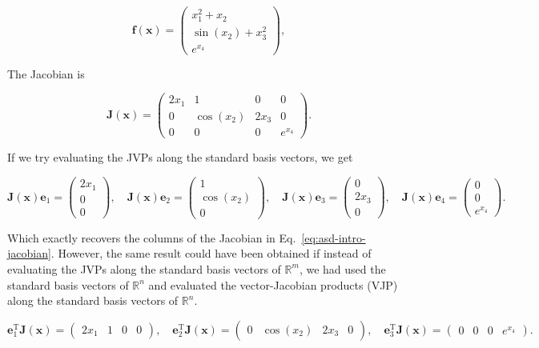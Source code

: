 \documentclass[12pt,a4paper]{article}
\numberwithin{equation}{section}
\begin{document}
\begin{equation}
  \bm f(\bm x)=\begin{pmatrix}
    x_1^2+x_2\\ \sin(x_2)+x_3^2\\  e^{x_4}
  \end{pmatrix},
  \label{eq:asd-intro-function}
\end{equation}

The Jacobian is

\begin{equation}
  \bm J(\bm x)=\begin{pmatrix}
    2x_1&1&0&0\\0&\cos(x_2)&2x_3&0\\0&0&0&e^{x_4}
  \end{pmatrix}.
  \label{eq:asd-intro-jacobian}
\end{equation}

If we try evaluating the JVPs along the standard basis vectors, we get

\begin{equation}
  \bm J(\bm x)\bm e_1 = \begin{pmatrix}2x_1\\0\\0\end{pmatrix}, \quad
  \bm J(\bm x)\bm e_2 = \begin{pmatrix}1\\\cos(x_2)\\0\end{pmatrix}, \quad
  \bm J(\bm x)\bm e_3 = \begin{pmatrix}0\\2x_3\\0\end{pmatrix}, \quad
  \bm J(\bm x)\bm e_4 = \begin{pmatrix}0\\0\\e^{x_4}\end{pmatrix}.
\end{equation}

Which exactly recovers the columns of the Jacobian in Eq.~\eqref{eq:asd-intro-jacobian}.
However, the same result could have been obtained if instead of evaluating the JVPs along the standard basis vectors of $\mathbb R^m$,
we had used the standard basis vectors of $\mathbb R^n$ and evaluated the vector-Jacobian products (VJP)
along the standard basis vectors of $\mathbb R^n$.

\begin{equation}
  \bm e_1^{\mathrm T}\bm J(\bm x) = \begin{pmatrix}2x_1&1&0&0\end{pmatrix}, \quad
  \bm e_2^{\mathrm T}\bm J(\bm x) = \begin{pmatrix}0&\cos(x_2)&2x_3&0\end{pmatrix}, \quad
  \bm e_3^{\mathrm T}\bm J(\bm x) = \begin{pmatrix}0&0&0&e^{x_4}\end{pmatrix}.
  \label{eq:asd-intro-vjp}
\end{equation}
\end{document}
